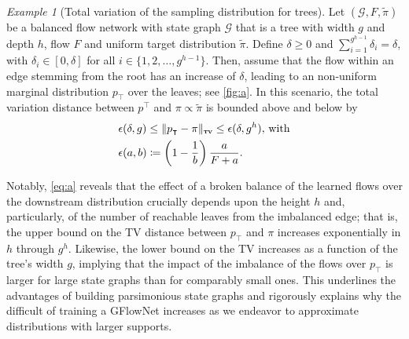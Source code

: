 \documentclass{article}
\theoremstyle{plain}
\theoremstyle{definition}
\theoremstyle{remark}
\theoremstyle{remark}
\newtheorem{example}[theorem]{Example}
\begin{document}
\begin{example}[Total variation of the sampling distribution for trees] \label{thm:a} 
    Let $(\mathcal{G}, F, \tilde{\pi})$ be a balanced flow network with state graph $\mathcal{G}$ that is a tree with width $g$ and depth $h$, flow $F$ and uniform target distribution $\tilde{\pi}$.  Define $\delta \ge 0$ and $\sum_{i=1}^{g^{h - 1}} \delta_{i} = \delta$, with $\delta_{i} \in [0, \delta]$ for all $i \in \{1, 2, \dots, g^{h - 1}\}$. Then, assume that the flow within an edge stemming from the root has an increase of $\delta$, leading to an non-uniform marginal distribution $p_{\intercal}$ over the leaves; see \autoref{fig:a}. In this scenario, the total variation distance between $p^{\intercal}$ and $\pi \propto \tilde{\pi}$ is bounded above and below by 
    \begin{equation}
    \label{eq:a} 
    \begin{aligned}
        & \epsilon(\delta, g) \leq \|p_{\intercal} - \pi\|_{\scaleto{\textbf{TV}}{3pt}} \leq \epsilon(\delta, g^{h}), \, \text{with} \\ 
        & \epsilon(a, b) \coloneqq \left(1 - \frac{1}{b}\right) \frac{a}{F + a}.  
    \end{aligned}
    \end{equation} 
\end{example}

Notably, \autoref{eq:a} reveals that the effect of a broken balance of the learned flows over the downstream distribution crucially depends upon the height $h$ and, particularly, of the number of reachable leaves from the imbalanced edge; that is, the upper bound on the TV distance between $p_{\intercal}$ and $\pi$ increases exponentially in $h$ through $g^{h}$. Likewise, the lower bound on the TV increases as a function of the tree's width $g$, implying that the impact of the imbalance of the flows over $p_{\intercal}$ is larger for large state graphs than for comparably small ones. This underlines the advantages of building parsimonious state graphs and rigorously explains why the difficult of training a GFlowNet increases as we endeavor to approximate distributions with larger supports. 
\end{document}
